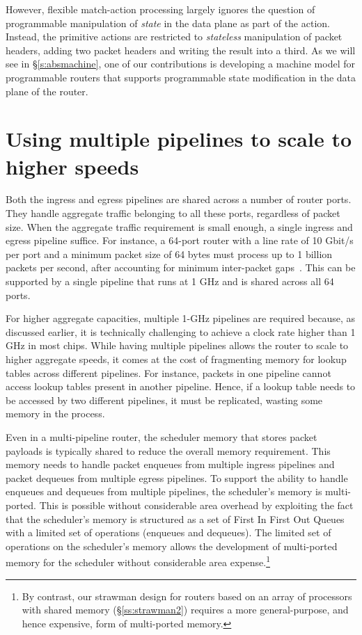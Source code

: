 However, flexible match-action processing largely ignores the question of
programmable manipulation of {\em state} in the data plane as part of the
action.  Instead, the primitive actions are restricted to {\em stateless}
manipulation of packet headers, \eg adding two packet headers and writing the
result into a third. As we will see in \S\ref{s:absmachine}, one of our
contributions is developing a machine model for programmable routers that
supports programmable state modification in the data plane of the router. 

\section{Using multiple pipelines to scale to higher speeds}
\label{s:router_multi_pipeline_arch}

Both the ingress and egress pipelines are shared across a number of router
ports.  They handle aggregate traffic belonging to all these ports, regardless
of packet size. When the aggregate traffic requirement is small enough, a
single ingress and egress pipeline suffice. For instance, a 64-port router with
a line rate of 10 Gbit/s per port and a minimum packet size of 64 bytes
must process up to 1 billion packets per second, after accounting for minimum
inter-packet gaps~\cite{rmt}.  This can be supported by a single
pipeline that runs at 1 GHz and is shared across all 64 ports.

For higher aggregate capacities, multiple 1-GHz pipelines are required because,
as discussed earlier, it is technically challenging to achieve a clock rate
higher than 1 GHz in most chips. While having multiple pipelines allows the
router to scale to higher aggregate speeds, it comes at the cost of fragmenting
memory for lookup tables across different pipelines.  For instance, packets in
one pipeline cannot access lookup tables present in another pipeline. Hence, if
a lookup table needs to be accessed by two different pipelines, it must be
replicated, wasting some memory in the process. 

Even in a multi-pipeline router, the scheduler memory that stores packet payloads is
typically shared to reduce the overall memory requirement. This memory needs to handle packet enqueues from multiple ingress pipelines and
packet dequeues from multiple egress pipelines. To support the ability to
handle enqueues and dequeues from multiple pipelines, the scheduler's memory is
multi-ported.  This is possible without considerable area overhead by
exploiting the fact that the scheduler's memory is structured as a set
of First In First Out Queues with a limited set of operations (\ie enqueues and
dequeues). The limited set of operations on the scheduler's memory allows the
development of multi-ported memory for the scheduler without considerable area
expense.\footnote{By contrast, our strawman design for routers based on an
array of processors with shared memory (\S\ref{ss:strawman2}) requires a more
general-purpose, and hence expensive, form of multi-ported memory.}

